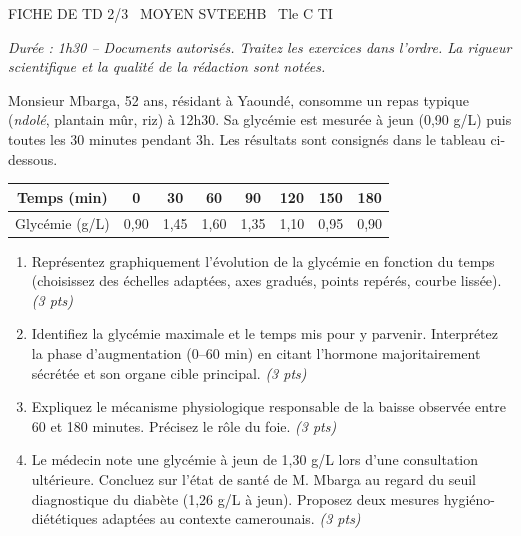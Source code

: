 \documentclass[11pt]{article}
\begin{document}
\begin{tcolorbox}[enhanced,colback=popink,colframe=popink,arc=10pt,boxrule=0pt,left=12pt,right=12pt,top=9pt,bottom=9pt]
{\color{white}\popxbold\small FICHE DE TD 2/3 \textbullet\ MOYEN \hfill SVTEEHB \textbullet\ Tle C TI\par}
\end{tcolorbox}
\vspace{4pt}
\emph{Durée : 1h30 -- Documents autorisés. Traitez les exercices dans l'ordre. La rigueur scientifique et la qualité de la rédaction sont notées.}

\begin{exercice}
Monsieur Mbarga, 52 ans, résidant à Yaoundé, consomme un repas typique (\textit{ndolé}, plantain mûr, riz) à 12h30. Sa glycémie est mesurée à jeun (0,90 g/L) puis toutes les 30 minutes pendant 3h. Les résultats sont consignés dans le tableau ci-dessous.

\begin{center}
\begin{tabular}{|c|c|c|c|c|c|c|c|}
\hline
Temps (min) & 0 & 30 & 60 & 90 & 120 & 150 & 180 \\
\hline
Glycémie (g/L) & 0,90 & 1,45 & 1,60 & 1,35 & 1,10 & 0,95 & 0,90 \\
\hline
\end{tabular}
\end{center}

\begin{enumerate}
    \item Représentez graphiquement l'évolution de la glycémie en fonction du temps (choisissez des échelles adaptées, axes gradués, points repérés, courbe lissée). \emph{(3 pts)}
    \item Identifiez la glycémie maximale et le temps mis pour y parvenir. Interprétez la phase d'augmentation (0--60 min) en citant l'hormone majoritairement sécrétée et son organe cible principal. \emph{(3 pts)}
    \item Expliquez le mécanisme physiologique responsable de la baisse observée entre 60 et 180 minutes. Précisez le rôle du foie. \emph{(3 pts)}
    \item Le médecin note une glycémie à jeun de 1,30 g/L lors d'une consultation ultérieure. Concluez sur l'état de santé de M. Mbarga au regard du seuil diagnostique du diabète (1,26 g/L à jeun). Proposez deux mesures hygiéno-diététiques adaptées au contexte camerounais. \emph{(3 pts)}
\end{enumerate}
\end{exercice}
\end{document}
